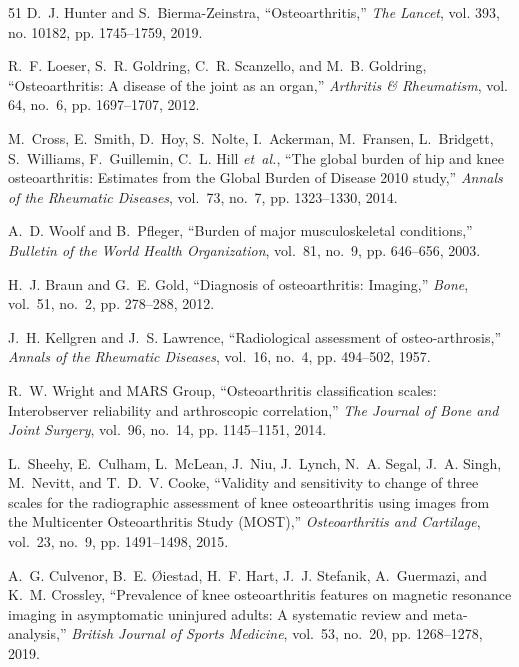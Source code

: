 \documentclass[10pt,journal]{IEEEtran}
\begin{document}
\FloatBarrier
\begin{thebibliography}{51}
D.~J. Hunter and S.~Bierma-Zeinstra, ``Osteoarthritis,'' \emph{The Lancet}, vol. 393, no. 10182, pp. 1745--1759, 2019.

R.~F. Loeser, S.~R. Goldring, C.~R. Scanzello, and M.~B. Goldring, ``Osteoarthritis: A disease of the joint as an organ,'' \emph{Arthritis \& Rheumatism}, vol. 64, no.~6, pp. 1697--1707, 2012.

M.~Cross, E.~Smith, D.~Hoy, S.~Nolte, I.~Ackerman, M.~Fransen, L.~Bridgett, S.~Williams, F.~Guillemin, C.~L. Hill \emph{et~al.}, ``The global burden of hip and knee osteoarthritis: Estimates from the Global Burden of Disease 2010 study,'' \emph{Annals of the Rheumatic Diseases}, vol.~73, no.~7, pp. 1323--1330, 2014.

A.~D. Woolf and B.~Pfleger, ``Burden of major musculoskeletal conditions,'' \emph{Bulletin of the World Health Organization}, vol.~81, no.~9, pp. 646--656, 2003.

H.~J. Braun and G.~E. Gold, ``Diagnosis of osteoarthritis: Imaging,'' \emph{Bone}, vol.~51, no.~2, pp. 278--288, 2012.

J.~H. Kellgren and J.~S. Lawrence, ``Radiological assessment of osteo-arthrosis,'' \emph{Annals of the Rheumatic Diseases}, vol.~16, no.~4, pp. 494--502, 1957.

R.~W. Wright and MARS Group, ``Osteoarthritis classification scales: Interobserver reliability and arthroscopic correlation,'' \emph{The Journal of Bone and Joint Surgery}, vol.~96, no.~14, pp. 1145--1151, 2014.

L.~Sheehy, E.~Culham, L.~McLean, J.~Niu, J.~Lynch, N.~A. Segal, J.~A. Singh, M.~Nevitt, and T.~D.~V. Cooke, ``Validity and sensitivity to change of three scales for the radiographic assessment of knee osteoarthritis using images from the Multicenter Osteoarthritis Study (MOST),'' \emph{Osteoarthritis and Cartilage}, vol.~23, no.~9, pp. 1491--1498, 2015.

A.~G. Culvenor, B.~E. {\O}iestad, H.~F. Hart, J.~J. Stefanik, A.~Guermazi, and K.~M. Crossley, ``Prevalence of knee osteoarthritis features on magnetic resonance imaging in asymptomatic uninjured adults: A systematic review and meta-analysis,'' \emph{British Journal of Sports Medicine}, vol.~53, no.~20, pp. 1268--1278, 2019.


\end{thebibliography}
\end{document}
